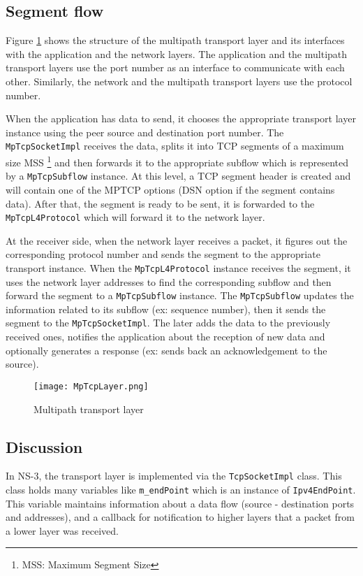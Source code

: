 \documentclass{sig-alternate}
\begin{document}
\subsection{Segment flow}

Figure \ref{MpTcpLayer} shows the structure of the multipath transport layer and its interfaces with the application and the network layers. The application and the multipath transport layers use the port number as an interface to communicate with each other. Similarly, the network and the multipath transport layers use the protocol number.

When the application has data to send, it chooses the appropriate transport layer instance using the peer source and destination port number. The \texttt{MpTcpSocketImpl} receives the data, splits it into TCP segments of a maximum size MSS \footnote{MSS: Maximum Segment Size} and then forwards it to the appropriate subflow which is represented by a \texttt{MpTcpSubflow} instance.
At this level, a TCP segment header is created and will contain one of the MPTCP options (DSN option if the segment contains data). After that, the segment is ready to be sent, it is forwarded to the \texttt{MpTcpL4Protocol} which will forward it to the network layer.

At the receiver side, when the network layer receives a packet, it figures out the corresponding protocol number and sends the segment to the appropriate transport instance. When the \texttt{MpTcpL4Protocol} instance receives the segment, it uses the network layer addresses to find the corresponding subflow and then forward the segment to a \texttt{MpTcpSubflow} instance. The \texttt{MpTcpSubflow} updates the information related to its subflow (ex: sequence number), then it sends the segment to the \texttt{MpTcpSocketImpl}. The later adds the data to the previously received ones, notifies the application about the reception of new data and optionally generates a response (ex: sends back an acknowledgement to the source).


\begin{figure}[h]
\centering
\texttt{[image: MpTcpLayer.png]} 
\caption{Multipath transport layer}
\label{MpTcpLayer}
\end{figure} 

\subsection{Discussion}
In NS-3, the transport layer is implemented via the \texttt{TcpSocketImpl} class. This class holds many variables like {\tt m\_endPoint} which is an instance of \texttt{Ipv4EndPoint}. This variable maintains information about a data flow (source - destination ports and addresses), and a callback for notification to higher layers that a packet from a lower layer was received.
 
\end{document}
